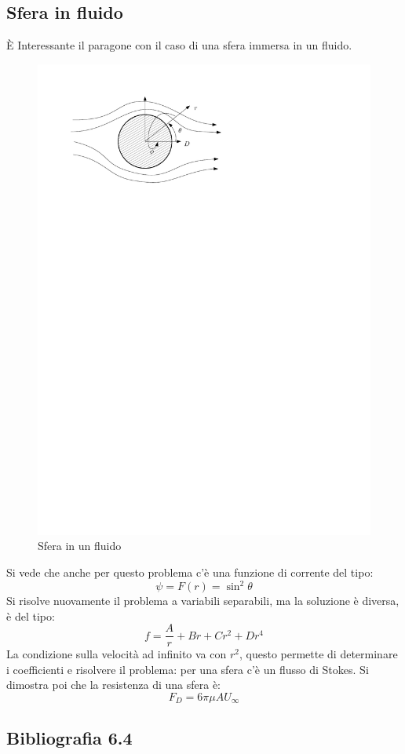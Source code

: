 \subsection{Sfera in fluido}
È Interessante il paragone con il caso di una sfera immersa in un fluido.

	\begin{figure}[ht]
		\includegraphics[scale=0.7]{./6.4 Correnti a basso numero di Reynolds/6.4-3}
		\centering
		\caption{Sfera in un fluido}
	\end{figure}
%
Si vede che anche per questo problema c'è una funzione di corrente del tipo:
%
	\begin{equation*}
		\psi = F(r) = \sin^2{\theta}
	\end{equation*}
%
Si risolve nuovamente il problema a variabili separabili, ma la soluzione è diversa, è del tipo:
%
	\begin{equation*}
		f = \frac{A}{r} + B r + C r^2 + D r^4
	\end{equation*}
%
La condizione sulla velocità ad infinito va con $r^2$, questo permette di determinare i coefficienti e risolvere il problema: per una sfera c'è un flusso di Stokes.
Si dimostra poi che la resistenza di una sfera è:
%
	\begin{equation*}
		F_D = 6 \pi \mu A U_{\infty}
	\end{equation*}
% 

\subsection*{Bibliografia 6.4}
\cite[Cap.\ 11.6]{CengelCimbala}\\
\cite[Cap.\ 9.3, 9.6]{PnueliGutfinger}